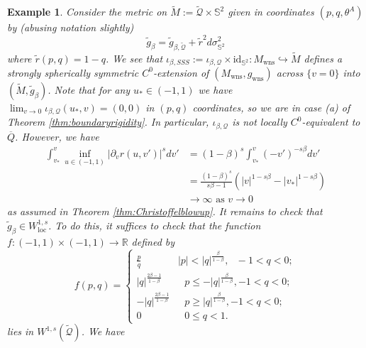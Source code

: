 \documentclass{article}
\newcommand{\Q}{\mathcal{Q}}
\newcommand{\loc}{\mathrm{loc}}
\newcommand{\Sp}{\mathbb{S}}
\newcommand{\id}{\mathrm{id}}
\newcommand{\Mw}{M_{\mathrm{wns}}}
\newcommand{\gw}{g_{\mathrm{wns}}}
\newcommand{\R}{\mathbb{R}}
\newtheorem{example}[definition]{Example}
\begin{document}
\begin{example}
   Consider the metric on $\tilde{M}:=\tilde{\Q}\times \Sp^2$ given in coordinates $(p,q,\theta^A)$ by (abusing notation slightly)
    \begin{equation}\label{eqn:fullcornermetric}
        \tilde{g}_{\beta}=\tilde{g}_{\beta,\tilde{\Q}}+\tilde{r}^2d\sigma^2_{\Sp^2}
    \end{equation}
    where $\tilde{r}(p,q)=1-q$.
    We see that
$\iota_{\beta,SSS}:=\iota_{\beta,\Q}\times{\id}_{\Sp^2}:\Mw\hookrightarrow \tilde{M}$ defines a strongly spherically symmetric $C^0$-extension of $(\Mw,\gw)$ across $\{v=0\}$ into $(\tilde{M},\tilde{g}_{\beta})$. Note that for any $u_*\in(-1,1)$ we have $\lim_{v\to0}\iota_{\beta,\Q}(u_*,v)=(0,0)$ in $(p,q)$ coordinates, so we are in case (a) of Theorem \ref{thm:boundaryrigidity}. In particular, $\iota_{\beta,\Q}$ is not locally $C^0$-equivalent to $\overline{Q}$. However, we have
\begin{equation}
    \begin{split}
       \int_{v_*}^v \inf_{u \in (-1,1)}\left|\partial_vr(u,v')\right|^{s}dv'&=(1-\beta)^{s}\int_{v_*}^v(-v')^{-s\beta}dv'\\
       &=\frac{(1-\beta)^{s}}{s\beta-1}\left(|v|^{1-s\beta}-|v_*|^{1-s\beta}\right)\\
       &\to\infty\text{ as }v\to0
    \end{split}
\end{equation}
as assumed in Theorem \ref{thm:Christoffelblowup}.
It remains to check that $\tilde{g}_{\beta}\in W^{1,s}_{\loc}$. To do this, it suffices to check that the function $f:(-1,1)\times(-1,1)\to\R$ defined by 
\begin{equation}
    f(p,q)=\begin{cases}
        \frac{p}{q} & |p| < |q|^{\frac{\beta}{1-\beta}}, \text{ }-1<q<0;\\
         |q|^{\frac{2\beta-1}{1-\beta}} & \text{ }p\leq -|q|^{\frac{\beta}{1-\beta}}, -1<q<0;\\
            - |q|^{\frac{2\beta-1}{1-\beta}}& \text{ }p\geq|q|^{\frac{\beta}{1-\beta}}, -1<q<0;\\
            0 & \text{ }0\leq q<1. 
    \end{cases}
\end{equation}
lies in $W^{1,s}(\tilde{\Q})$. We have
\begin{equation}

\end{equation}
\end{example}
\end{document}
